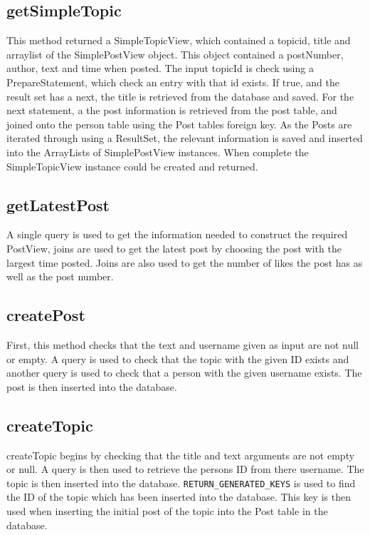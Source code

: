 \documentclass{article}
\begin{document}
\subsection*{getSimpleTopic}

This method returned a SimpleTopicView, which contained a topicid, title and arraylist of the SimplePostView object. This object contained a postNumber, author, text and time when posted. The input topicId is check using a PrepareStatement, which check an entry with that id exists. If true, and the result set has a next, the title is retrieved from the database and saved. For the next statement, a the post information is retrieved from the post table, and joined onto the person table using the Post tables foreign key. As the Posts are iterated through using a ResultSet, the relevant information is saved and inserted into the ArrayLists of SimplePostView instances. When complete the SimpleTopicView instance could be created and returned.

\subsection*{getLatestPost}

A single query is used to get the information needed to construct the required PostView, joins are used to get the latest post by choosing the post with the largest time posted. Joins are also used to get the number of likes the post has as well as the post number.

\subsection*{createPost}

First, this method checks that the text and username given as input are not null or empty. A query is used to check that the topic with the given ID exists and another query is used to check that a person with the given username exists. The post is then inserted into the database.

\subsection*{createTopic}

createTopic begins by checking that the title and text arguments are not empty or null. A query is then used to retrieve the persons ID from there username. The topic is then inserted into the database. \texttt{RETURN\_GENERATED\_KEYS} is used to find the ID of the topic which has been inserted into the database. This key is then used when inserting the initial post of the topic into the Post table in the database.
\end{document}
